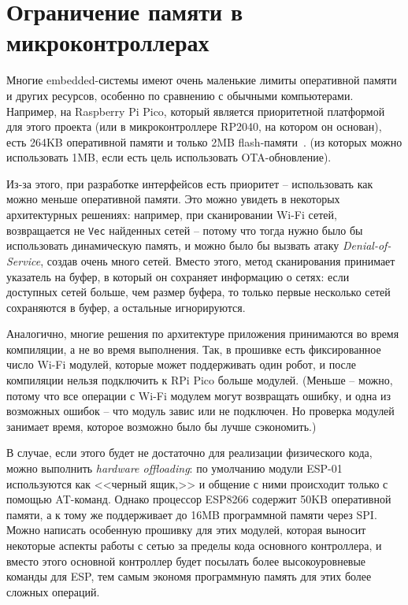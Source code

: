 \documentclass[%
]{report}
\begin{document}
\section{Ограничение памяти в микроконтроллерах}

Многие embedded-системы имеют очень маленькие лимиты оперативной
памяти и других ресурсов, особенно по сравнению с обычными компьютерами.
Например, на Raspberry Pi Pico,
который является приоритетной платформой для этого проекта
(или в микроконтроллере RP2040, на котором он основан),
есть 264KB оперативной памяти
и только 2MB flash-памяти~\cite{raspberrypi2021}.
(из которых можно использовать 1MB, если есть цель использовать OTA-обновление).

Из-за этого, при разработке интерфейсов есть приоритет --
использовать как можно меньше оперативной памяти.
Это можно увидеть в некоторых архитектурных решениях:
например, при сканировании Wi-Fi сетей,
возвращается не \texttt{Vec} найденных сетей -- 
потому что тогда нужно было бы использовать динамическую память,
и можно было бы вызвать атаку \emph{Denial-of-Service},
создав очень много сетей.
Вместо этого, метод сканирования принимает указатель на буфер,
в который он сохраняет информацию о сетях:
если доступных сетей больше, чем размер буфера,
то только первые несколько сетей сохраняются в буфер,
а остальные игнорируются.

Аналогично, многие решения по архитектуре приложения
принимаются во время компиляции, а не во время выполнения.
Так, в прошивке есть фиксированное число Wi-Fi модулей,
которые может поддерживать один робот,
и после компиляции нельзя подключить к RPi Pico больше модулей.
(Меньше -- можно, потому что все операции с Wi-Fi модулем могут возвращать ошибку,
и одна из возможных ошибок -- что модуль завис или не подключен. Но проверка модулей
занимает время, которое возможно было бы лучше сэкономить.)

В случае, если этого будет не достаточно для реализации физического кода,
можно выполнить \emph{hardware offloading}:
по умолчанию модули ESP-01 используются как <<черный ящик,>>
и общение с ними происходит только с помощью AT-команд.
Однако процессор ESP8266 содержит 50KB оперативной памяти,
а к тому же поддерживает до 16MB программной памяти через SPI.
Можно написать особенную прошивку для этих модулей,
которая выносит некоторые аспекты работы с сетью
за пределы кода основного контроллера,
и вместо этого основной контроллер будет посылать более высокоуровневые
команды для ESP,
тем самым экономя программную память для этих более сложных операций.
\end{document}
